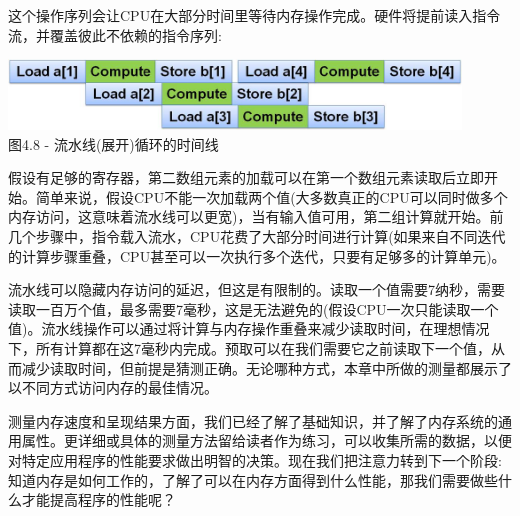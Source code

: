 这个操作序列会让CPU在大部分时间里等待内存操作完成。硬件将提前读入指令流，并覆盖彼此不依赖的指令序列:

\begin{center}
\includegraphics[width=0.9\textwidth]{content/1/chapter4/images/8.jpg}\\
图4.8 - 流水线(展开)循环的时间线
\end{center}

假设有足够的寄存器，第二数组元素的加载可以在第一个数组元素读取后立即开始。简单来说，假设CPU不能一次加载两个值(大多数真正的CPU可以同时做多个内存访问，这意味着流水线可以更宽)，当有输入值可用，第二组计算就开始。前几个步骤中，指令载入流水，CPU花费了大部分时间进行计算(如果来自不同迭代的计算步骤重叠，CPU甚至可以一次执行多个迭代，只要有足够多的计算单元)。

流水线可以隐藏内存访问的延迟，但这是有限制的。读取一个值需要7纳秒，需要读取一百万个值，最多需要7毫秒，这是无法避免的(假设CPU一次只能读取一个值)。流水线操作可以通过将计算与内存操作重叠来减少读取时间，在理想情况下，所有计算都在这7毫秒内完成。预取可以在我们需要它之前读取下一个值，从而减少读取时间，但前提是猜测正确。无论哪种方式，本章中所做的测量都展示了以不同方式访问内存的最佳情况。

测量内存速度和呈现结果方面，我们已经了解了基础知识，并了解了内存系统的通用属性。更详细或具体的测量方法留给读者作为练习，可以收集所需的数据，以便对特定应用程序的性能要求做出明智的决策。现在我们把注意力转到下一个阶段:知道内存是如何工作的，了解了可以在内存方面得到什么性能，那我们需要做些什么才能提高程序的性能呢？
















